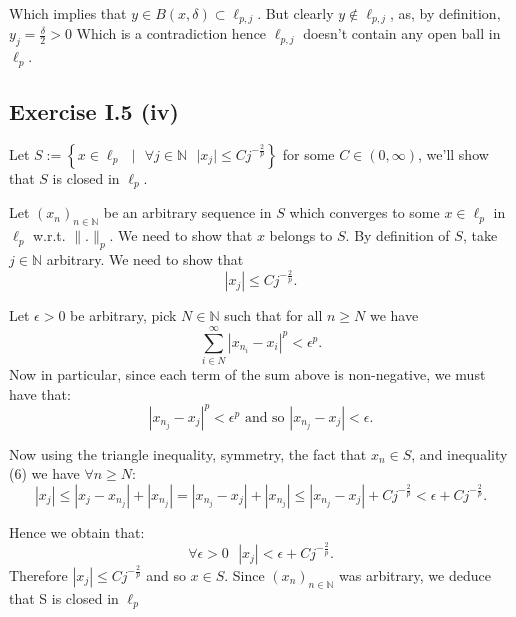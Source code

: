 \documentclass[11pt]{article}
\newcommand\lb{\left\lbrace}
\newcommand\rb{\right\rbrace}
\newcommand\st{\text{ } | \text{ }}
\newcommand\N{\mathbb{N}}
\begin{document}
Which implies that $y \in B(x, \delta) \subset \ell_{p, j}$.
But clearly  $y \notin \ell_{p, j}$, as, by definition, $y_j = \frac{\delta}{2} > 0$
Which is a contradiction hence $\ell_{p, j}$ doesn't contain any open ball
in $\ell_p$. \hfill\blacksquare

\subsection*{Exercise I.5 (iv)}

Let $S := \lb x \in \ell_p \st \forall j \in \N \text{ } |x_j| \le Cj^{-\frac{2}{p}}\rb$
for some $C \in (0, \infty)$, we'll show that $S$ is closed in $\ell_p$.

Let $(x_n)_{n \in \mathbb{N}}$ be an arbitrary sequence in $S$ which
converges to some $x \in \ell_p $ in $\ell_p$ w.r.t.  $ \|.\|_p$. We need to show
that $x$ belongs to $S$. By definition of $S$, take  $j \in \N$ arbitrary. We need
to show that
\[
|x_j| \le Cj^{-\frac{2}{p}}
.\]

Let $\epsilon > 0$ be arbitrary, pick $N \in \N$ such that for all $n \ge N$ we
have
\[
\sum_{i \in N}^\infty |x_{n_i} - x_i|^p < \epsilon^p
.\]
Now in particular, since each term of the sum above is non-negative, we must
have that:
\begin{equation}
  {|x_{n_j} - x_j|}^p < \epsilon^p \text{ and so } {|x_{n_j} - x_j|} < \epsilon
.\end{equation}

Now using the triangle inequality, symmetry, the fact that $x_n \in S$, and inequality (6) we have $\forall n \ge N$:
\[
  |x_j| \le |x_j - x_{n_j}| + |x_{n_j}| = |x_{n_j} - x_j| + |x_{n_j}|
  \le |x_{n_j} - x_j| + Cj^{-\frac{2}{p}} < \epsilon + Cj^{-\frac{2}{p}}
.\]

Hence we obtain that:
\[
  \forall \epsilon > 0 \text{ } |x_j| < \epsilon + Cj^{-\frac{2}{p}}
.\]
Therefore $|x_j| \le Cj^{-\frac{2}{p}}$ and so $x \in S$. Since  $(x_n)_{n \in \mathbb{N}}$
 was arbitrary, we deduce that S is closed in $\ell_p$
\end{document}
